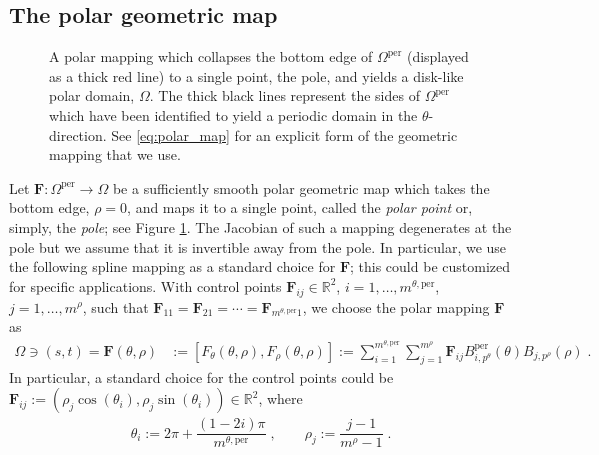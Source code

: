 \documentclass[10pt]{article}
\newcommand{\includetikz}[2]{%
}
\newcommand{\mbf}[1]{{\boldsymbol{#1}}}
\newcommand{\RR}{{\mathbb{R}}}
\newcommand{\cU}{\theta}
\newcommand{\cV}{\rho}
\newcommand{\degU}{p^\cU}
\newcommand{\degV}{p^\cV}
\newcommand{\ndofV}{m^\cV}
\newcommand{\bsp}{B}
\newcommand{\cS}{s}
\newcommand{\cT}{t}
\newcommand{\per}{\mathrm{per}}
\newcommand{\pndofU}{m^{\cU,\per}}
\newcommand{\qDomain}{\Omega^{\per}}
\newcommand{\polarDomain}{\Omega}
\theoremstyle{plain}
\theoremstyle{definition}
\theoremstyle{remark}
\begin{document}
\subsection{The polar geometric map}
\label{subsec:polar-map}

\begin{figure}
    \centering
    \includetikz{polar_map_horiz}{./tikz}
    \caption{
        A polar mapping which collapses the bottom edge of $\qDomain$ (displayed as a thick red line) to a single point, the pole, and yields a disk-like polar domain, $\polarDomain$.
        The thick black lines represent the sides of $\qDomain$ which have been identified to yield a periodic domain in the $\cU$-direction.
        See \eqref{eq:polar_map} for an explicit form of the geometric mapping that we use.
    }\label{fig:polar_map}
\end{figure}

Let $\mbf{F} : \qDomain \rightarrow \polarDomain$ be a sufficiently smooth polar geometric map which takes the bottom edge, $\cV = 0$, and maps it to a single point, called the \emph{polar point} or, simply, the \emph{pole}; see Figure \ref{fig:polar_map}.
The Jacobian of such a mapping degenerates at the pole but we assume that it is invertible away from the pole.
In particular, we use the following spline mapping as a standard choice for $\mbf{F}$; this could be customized for specific applications.
With control points $\mbf{F}_{ij} \in \RR^2$, $i = 1, \dots, \pndofU$, $j = 1, \dots, \ndofV$, such that $\mbf{F}_{11} = \mbf{F}_{21} = \cdots = \mbf{F}_{\pndofU 1}$, we choose the polar mapping $\mbf{F}$ as
\begin{equation}\label{eq:polar_map}
    \begin{split}
        \polarDomain \ni (\cS, \cT) = \mbf{F}(\cU, \cV) &:= \left[F_\cU(\cU, \cV), F_\cV(\cU, \cV)\right]
        := \sum_{i=1}^{\pndofU}\sum_{j=1}^{\ndofV} \mbf{F}_{ij} \bsp^{\per}_{i,\degU}(\cU) \bsp_{j,\degV}(\cV)\;.
    \end{split}
\end{equation}
In particular, a standard choice for the control points \cite{Toshniwal:2017} could be $\mbf{F}_{ij} := \left( \rho_j\cos(\theta_i),\rho_j\sin(\theta_i) \right) \in \RR^2$, where
\begin{equation}\label{eq:control-points}
    \begin{split}
        \theta_i := 2\pi + \dfrac{(1-2i)\pi}{\pndofU}\;,\qquad
        \rho_j := \dfrac{j-1}{\ndofV-1}\;.
    \end{split}
\end{equation}
\end{document}
